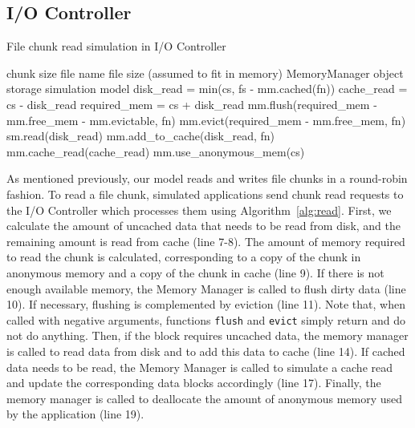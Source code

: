 \documentclass[conference]{IEEEtran}
\newcommand{\Desc}[2]{\State \makebox[2em][l]{#1}#2}
\begin{document}
    \subsection{I/O Controller}

    \begin{algorithm}\caption{File chunk read simulation in I/O Controller}
    \label{alg:read}
        \small
        \begin{algorithmic}[1]
            \Input
                \Desc{cs}{chunk size}
                \Desc{fn}{file name}
                \Desc{fs}{file size (assumed to fit in memory)}
                \Desc{mm}{MemoryManager object}
                \Desc{sm}{storage simulation model}
               \EndInput
               \State disk\_read = min(cs, fs - mm.cached(fn)) 
               \State cache\_read = cs - disk\_read 
               \State required\_mem = cs + disk\_read
               \State mm.flush(required\_mem - mm.free\_mem - mm.evictable, fn)
               \State mm.evict(required\_mem - mm.free\_mem, fn)
                 
               \State sm.read(disk\_read)
               \State mm.add\_to\_cache(disk\_read, fn)
               \EndIf
                
               \State mm.cache\_read(cache\_read)
            \EndIf
            \State mm.use\_anonymous\_mem(cs)
        \end{algorithmic}
    \end{algorithm}
    As mentioned previously, our model reads and writes file chunks in a
    round-robin fashion. To read a file chunk, simulated applications send
    chunk read requests to the I/O Controller which processes them using
    Algorithm~\ref{alg:read}. First, we calculate the amount of uncached
    data that needs to be read from disk, and the remaining amount is read
    from cache (line 7-8). The amount of memory required to read the chunk
    is calculated, corresponding to a copy of the chunk in anonymous memory
    and a copy of the chunk in cache (line 9).
    If there is not enough available memory, the Memory Manager is called
    to flush dirty data (line 10). If necessary, flushing is complemented by
    eviction (line 11). Note that, when called with negative arguments, functions
    \texttt{flush} and \texttt{evict} simply return and do not do anything. Then,
    if the block requires
    uncached data, the memory manager is called to read data from disk and to add this
    data to cache (line 14).
    If cached data needs to be read, the Memory Manager is called to simulate
    a cache read  and update the corresponding data blocks accordingly (line 17).
    Finally, the memory manager is called to deallocate the amount of anonymous memory used by the application (line 19).
\end{document}
